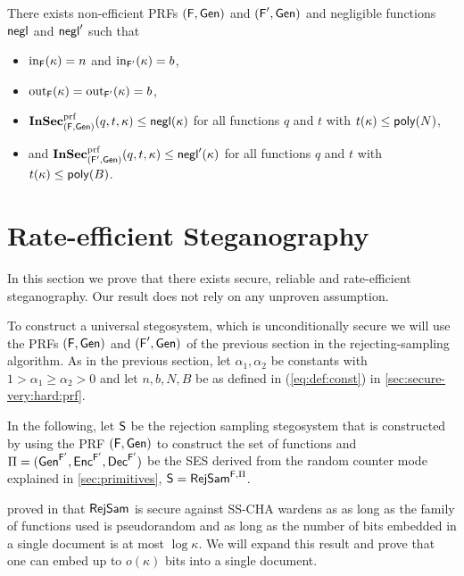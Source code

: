 \begin{corollary}
  There exists non-efficient \acp{PRF} $(\operatorname{\mathsf{F}},\operatorname{\mathsf{Gen}})$ and
  $(\operatorname{\mathsf{F}}',\operatorname{\mathsf{Gen}})$ and negligible functions $\operatorname{\mathsf{negl}}$ and $\operatorname{\mathsf{negl}}'$ such
  that 
  \begin{itemize}
  \item $\operatorname{in}_{\operatorname{\mathsf{F}}}(\kappa)=n$ and $\operatorname{in}_{\operatorname{\mathsf{F}}'}(\kappa)=b$,
  \item $\operatorname{out}_{\operatorname{\mathsf{F}}}(\kappa)=\operatorname{out}_{\operatorname{\mathsf{F}}'}(\kappa)=b$,
  \item $\operatorname{\mathbf{InSec}}^{\operatorname{prf}}_{(\operatorname{\mathsf{F}},\operatorname{\mathsf{Gen}})}(q,t,\kappa)\leq \operatorname{\mathsf{negl}}(\kappa)$ for all
    functions $q$ and $t$ with $t(\kappa) \leq \operatorname{\mathsf{poly}}(N)$,
  \item and $\operatorname{\mathbf{InSec}}^{\operatorname{prf}}_{(\operatorname{\mathsf{F}}',\operatorname{\mathsf{Gen}})}(q,t,\kappa)\leq \operatorname{\mathsf{negl}}'(\kappa)$
    for all functions $q$ and $t$ with $t(\kappa) \leq \operatorname{\mathsf{poly}}(B)$.
  \end{itemize}
\end{corollary}

\section{Rate-efficient Steganography }
\label{sec:secure-steg-exists}

In this section we prove that there exists secure, reliable and 
rate-efficient steganography.
Our result does not rely on any unproven assumption.

To construct a universal stegosystem, which is unconditionally secure
we will use the \acp{PRF} $(\operatorname{\mathsf{F}},\operatorname{\mathsf{Gen}})$ and $(\operatorname{\mathsf{F}}',\operatorname{\mathsf{Gen}})$
of the previous section
in the rejecting-sampling algorithm.
As in the previous section, 
let $\alpha_1,\alpha_2$ be constants with 
$1>\alpha_{1}\geq \alpha_{2}>0$
and let $n, b,N, B$ be as defined in (\autoref{eq:def:const}) 
in \autoref{sec:secure-very:hard:prf}. 

In the following, let $\operatorname{\mathsf{S}}$ be the rejection sampling stegosystem that
is constructed by using the \ac{PRF} $(\operatorname{\mathsf{F}},\operatorname{\mathsf{Gen}})$ to construct the set
of functions and $\Pi=(\operatorname{\mathsf{Gen}}^{\operatorname{\mathsf{F}}'},\operatorname{\mathsf{Enc}}^{\operatorname{\mathsf{F}}'},\operatorname{\mathsf{Dec}}^{\operatorname{\mathsf{F}}'})$ be
the \ac{SES} derived from the random counter mode explained in
\autoref{sec:primitives}, \ie $\operatorname{\mathsf{S}}=\operatorname{\mathsf{RejSam}}^{\operatorname{\mathsf{F}},\Pi}$.

\citeauthor{backes2005active}  proved in \cite{backes2005active} that $\operatorname{\mathsf{RejSam}}$ is
secure against \ac{SS-CHA} wardens as
as long as the family of
functions used is pseudorandom and as long as the number of bits
embedded in a single document is at most $\log \kappa$. We will expand
this result and prove that one can embed up to $o(\kappa)$ bits into
a single document.


